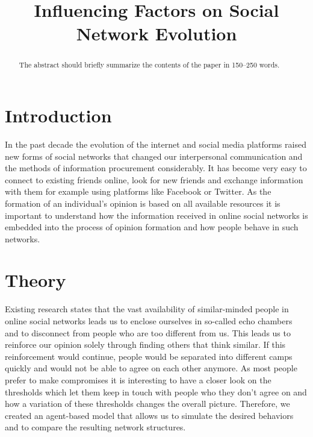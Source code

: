 \documentclass[runningheads]{llncs}
\begin{document}
%
\title{Influencing Factors on Social Network Evolution}
%
%


%
\maketitle              %
%
\begin{abstract}
The abstract should briefly summarize the contents of the paper in
150--250 words.

\end{abstract}
%
%
%
\hypertarget{introduction}{%
\section{Introduction}\label{introduction}}

In the past decade the evolution of the internet and social media
platforms raised new forms of social networks that changed our
interpersonal communication and the methods of information procurement
considerably. It has become very easy to connect to existing friends
online, look for new friends and exchange information with them for
example using platforms like Facebook or Twitter. As the formation of an
individual's opinion is based on all available resources it is important
to understand how the information received in online social networks is
embedded into the process of opinion formation and how people behave in
such networks.

\hypertarget{theory}{%
\section{Theory}\label{theory}}

Existing research states that the vast availability of similar-minded
people in online social networks leads us to enclose ourselves in
so-called echo chambers and to disconnect from people who are too
different from us. This leads us to reinforce our opinion solely through
finding others that think similar. If this reinforcement would continue,
people would be separated into different camps quickly and would not be
able to agree on each other anymore. As most people prefer to make
compromises it is interesting to have a closer look on the thresholds
which let them keep in touch with people who they don't agree on and how
a variation of these thresholds changes the overall picture. Therefore,
we created an agent-based model that allows us to simulate the desired
behaviors and to compare the resulting network structures.
\end{document}
